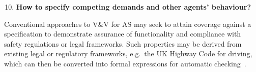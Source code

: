 \documentclass[sigconf,nonacm]{acmart}%
\begin{document}
%
%


\begin{enumerate}[leftmargin=0.5cm]
		\setcounter{enumi}{9}
	\item \textbf{How to specify competing demands and other agents' behaviour?}
\end{enumerate}
Conventional approaches to V\&V for AS may seek to attain coverage against a specification to demonstrate assurance of functionality and compliance with safety regulations or legal frameworks. 
Such properties may be derived from existing legal or regulatory frameworks, e.g.\ the UK Highway Code for driving, which can then be converted into formal expressions for automatic checking~\cite{harper2021safety}.
\end{document}
